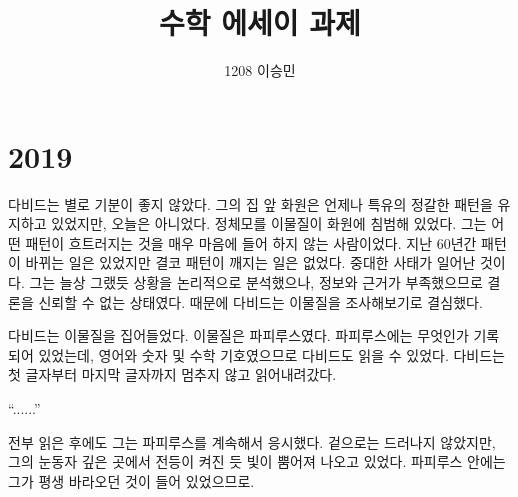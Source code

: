 \documentclass[9pt,showtrims,twoside,openright,chapter]{oblivoir}
\title{수학 에세이 과제}
\author{1208 이승민}
\begin{document}
\maketitle
\mainmatter
\pagestyle{KNUworkshop}

\chapter{2019}
\indent
\hspace{10pt} 다비드는 별로 기분이 좋지 않았다. 그의 집 앞 화원은 언제나 특유의 정갈한 패턴을 유지하고 있었지만, 오늘은 아니었다. 정체모를 이물질이 화원에 침범해 있었다. 그는 어떤 패턴이 흐트러지는 것을 매우 마음에 들어 하지 않는 사람이었다. 지난 60년간 패턴이 바뀌는 일은 있었지만 결코 패턴이 깨지는 일은 없었다. 중대한 사태가 일어난 것이다. 그는 늘상 그랬듯 상황을 논리적으로 분석했으나, 정보와 근거가 부족했으므로 결론을 신뢰할 수 없는 상태였다. 때문에 다비드는 이물질을 조사해보기로 결심했다. \par
 다비드는 이물질을 집어들었다. 이물질은 파피루스였다. 파피루스에는 무엇인가 기록되어 있었는데, 영어와 숫자 및 수학 기호였으므로 다비드도 읽을 수 있었다. 다비드는 첫 글자부터 마지막 글자까지 멈추지 않고 읽어내려갔다. \par
 “......” \par
 전부 읽은 후에도 그는 파피루스를 계속해서 응시했다. 겉으로는 드러나지 않았지만, 그의 눈동자 깊은 곳에서 전등이 켜진 듯 빛이 뿜어져 나오고 있었다. 파피루스 안에는 그가 평생 바라오던 것이 들어 있었으므로.
 \\
\end{document}
